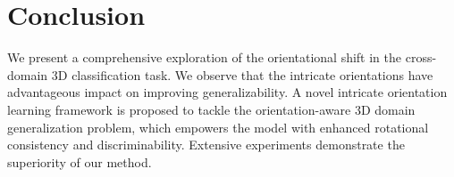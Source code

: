 \vspace{-2mm}
\section{Conclusion} \label{sec:conclusion}
We present a comprehensive exploration of the orientational shift in 
the cross-domain 3D classification task. We observe that the intricate orientations have advantageous impact on improving generalizability. A novel intricate orientation learning framework is proposed to tackle the orientation-aware 3D domain generalization problem, which empowers the model with enhanced rotational consistency and discriminability. Extensive experiments demonstrate the superiority of our method.

